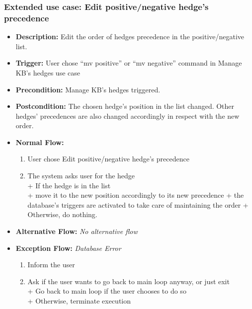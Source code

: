 \documentclass[../gr-final.tex]{subfiles}
\begin{document}
\subsubsection{Extended use case: Edit positive/negative hedge's precedence}
\begin{itemize}
  \item {\bfseries Description:} Edit the order of hedges precedence in the
    positive/negative list. 
  \item {\bfseries Trigger:} User chose ``mv positive'' or
    ``mv negative'' command in
    Manage KB's hedges use case
  \item {\bfseries Precondition:} Manage KB's hedges triggered.
  \item {\bfseries Postcondition:} The chosen hedge's position in
    the list changed. Other hedges' precedences are also changed
    accordingly in respect with the new order.
  \item {\bfseries Normal Flow:}
    \begin{enumerate}
      \item User chose Edit positive/negative hedge's precedence
      \item The system asks user for the hedge\\
        \indent + If the hedge is in the list\\
        \indent\indent + move it to the new position accordingly
        to its new precedence
        \indent\indent + the database's triggers are activated to
        take care of maintaining the order
        \indent + Otherwise, do nothing.
    \end{enumerate}
  \item {\bfseries Alternative Flow:} {\em No alternative flow}
  \item {\bfseries Exception Flow:}
    {\em Database Error}
    \begin{enumerate}
      \item Inform the user
      \item Ask if the user wants to go back to main loop anyway,
        or just exit\\
        \indent + Go back to main loop if the user chooses to do
        so\\
        \indent + Otherwise, terminate execution
    \end{enumerate}
\end{itemize}
\end{document}
